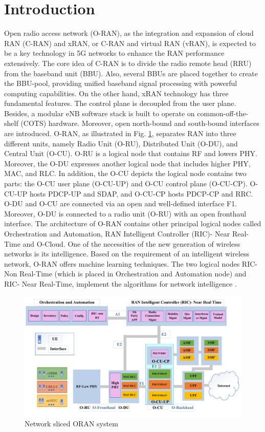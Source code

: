 \documentclass{article}
\begin{document}
\section{Introduction} 
Open radio access network (O-RAN), as the integration and expansion of cloud RAN (C-RAN) and xRAN, or C-RAN and virtual RAN (vRAN), is expected to be a key technology in 5G networks to enhance the RAN performance extensively. 
The core idea of C-RAN is to divide the radio remote head (RRU) from the baseband unit (BBU). Also, several BBUs are placed together to create the BBU-pool, providing unified baseband signal processing with powerful computing capabilities. On the other hand, xRAN technology has three fundamental features. The control plane is decoupled from the user plane. Besides, a modular eNB software stack is built to operate on common-off-the-shelf (COTS) hardware. Moreover, open north-bound and south-bound interfaces are introduced.
O-RAN, as illustrated in Fig. \ref{fig:c11}, separates RAN into three different units, namely Radio Unit (O-RU), Distributed Unit (O-DU), and Central Unit (O-CU). O-RU is a logical node that contains RF and lowers PHY. Moreover, the O-DU expresses another logical node that includes higher PHY, MAC, and RLC. In addition, the O-CU depicts the logical node contains two parts: the O-CU user plane (O-CU-UP) and O-CU control plane (O-CU-CP). O-CU-UP hosts PDCP-UP and SDAP, and O-CU-CP hosts PDCP-CP and RRC. O-DU and O-CU are connected via an open and well-defined interface F1.
Moreover, O-DU is connected to a radio unit (O-RU) with an open fronthaul interface.
The architecture of O-RAN contains other principal logical nodes called Orchestration and Automation,
RAN Intelligent Controller (RIC)- Near Real-Time and O-Cloud. 
One of the necessities of the new generation of wireless networks is its intelligence.
Based on the requirement of an intelligent wireless network, O-RAN offers machine learning techniques. The two logical nodes RIC-Non Real-Time (which is placed in Orchestration and Automation node) and RIC- Near Real-Time, implement the algorithms for network intelligence
\cite{gavrilovska2020cloud,niknam2020intelligent,kazemifard2021minimum,both2021system,ORANArch,ORANML,lin2021toward}.
\begin{figure}
  \centering 
    \includegraphics[scale = 0.5]{finalDraw.pdf}
  \caption{Network sliced ORAN system}
  \label{fig:c11}
\end{figure}
\end{document}
